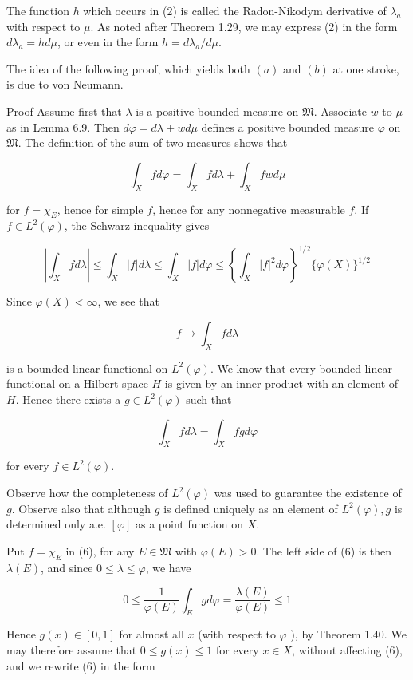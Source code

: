 \documentclass[10pt]{article}
\begin{document}
The function $h$ which occurs in (2) is called the Radon-Nikodym derivative of $\lambda_{a}$ with respect to $\mu$. As noted after Theorem 1.29, we may express (2) in the form $d \lambda_{a}=h d \mu$, or even in the form $h=d \lambda_{a} / d \mu$.

The idea of the following proof, which yields both $(a)$ and $(b)$ at one stroke, is due to von Neumann.

Proof Assume first that $\lambda$ is a positive bounded measure on $\mathfrak{M}$. Associate $w$ to $\mu$ as in Lemma 6.9. Then $d \varphi=d \lambda+w d \mu$ defines a positive bounded measure $\varphi$ on $\mathfrak{M}$. The definition of the sum of two measures shows that

$$
\int_{X} f d \varphi=\int_{X} f d \lambda+\int_{X} f w d \mu
$$

for $f=\chi_{E}$, hence for simple $f$, hence for any nonnegative measurable $f$. If $f \in L^{2}(\varphi)$, the Schwarz inequality gives

$$
\left|\int_{X} f d \lambda\right| \leq \int_{X}|f| d \lambda \leq \int_{X}|f| d \varphi \leq\left\{\int_{X}|f|^{2} d \varphi\right\}^{1 / 2}\{\varphi(X)\}^{1 / 2}
$$

Since $\varphi(X)<\infty$, we see that

$$
f \rightarrow \int_{X} f d \lambda
$$

is a bounded linear functional on $L^{2}(\varphi)$. We know that every bounded linear functional on a Hilbert space $H$ is given by an inner product with an element of $H$. Hence there exists a $g \in L^{2}(\varphi)$ such that

$$
\int_{X} f d \lambda=\int_{X} f g d \varphi
$$

for every $f \in L^{2}(\varphi)$.

Observe how the completeness of $L^{2}(\varphi)$ was used to guarantee the existence of $g$. Observe also that although $g$ is defined uniquely as an element of $L^{2}(\varphi), g$ is determined only a.e. $[\varphi]$ as a point function on $X$.

Put $f=\chi_{E}$ in (6), for any $E \in \mathfrak{M}$ with $\varphi(E)>0$. The left side of (6) is then $\lambda(E)$, and since $0 \leq \lambda \leq \varphi$, we have

$$
0 \leq \frac{1}{\varphi(E)} \int_{E} g d \varphi=\frac{\lambda(E)}{\varphi(E)} \leq 1
$$

Hence $g(x) \in[0,1]$ for almost all $x$ (with respect to $\varphi$ ), by Theorem 1.40. We may therefore assume that $0 \leq g(x) \leq 1$ for every $x \in X$, without affecting (6), and we rewrite (6) in the form
\end{document}
